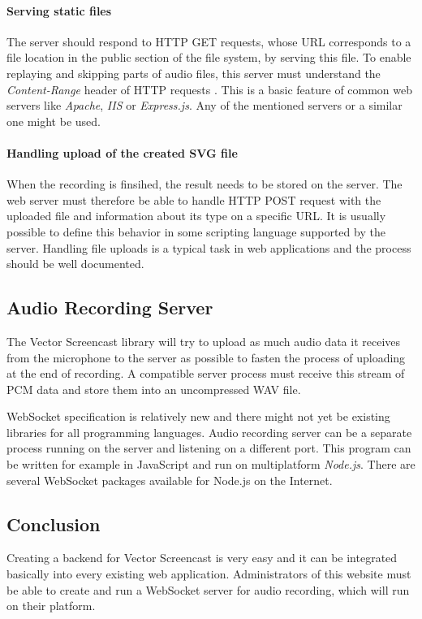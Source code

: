\paragraph{Serving static files}
The server should respond to HTTP GET requests, whose URL corresponds to a file location in the public section of the file system, by serving this file. To enable replaying and skipping parts of audio files, this server must understand the \textit{Content-Range} header of HTTP requests \cite{content_range}. This is a basic feature of common web servers like \textit{Apache}, \textit{IIS} or \textit{Express.js}. Any of the mentioned servers or a similar one might be used.

\paragraph{Handling upload of the created SVG file}
When the recording is finsihed, the result needs to be stored on the server. The web server must therefore be able to handle HTTP POST request with the uploaded file and information about its type on a specific URL. It is usually possible to define this behavior in some scripting language supported by the server. Handling file uploads is a typical task in web applications and the process should be well documented.

\subsection{Audio Recording Server}
The Vector Screencast library will try to upload as much audio data it receives from the microphone to the server as possible to fasten the process of uploading at the end of recording. A compatible server process must receive this stream of PCM data and store them into an uncompressed WAV file.

WebSocket specification is relatively new and there might not yet be existing libraries for all programming languages. Audio recording server can be a separate process running on the server and listening on a different port. This program can be written for example in JavaScript and run on multiplatform \textit{Node.js}. There are several WebSocket packages available for Node.js on the Internet.

\subsection{Conclusion}
Creating a backend for Vector Screencast is very easy and it can be integrated basically into every existing web application. Administrators of this website must be able to create and run a WebSocket server for audio recording, which will run on their platform.